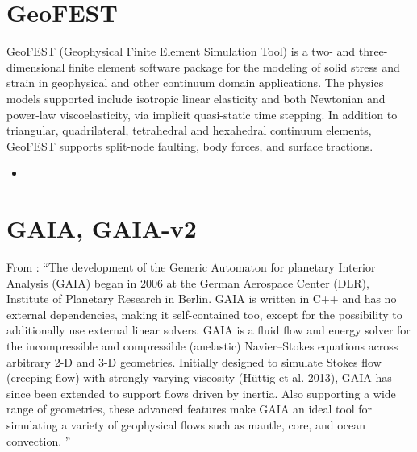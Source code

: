 
\section{GeoFEST} 
GeoFEST (Geophysical Finite Element Simulation Tool) is a two- and three-dimensional finite
element software package for the modeling of solid stress and strain in geophysical and 
other continuum domain applications.
The physics models supported include isotropic linear elasticity and both Newtonian and power-law
viscoelasticity, via implicit quasi-static time stepping. In addition to triangular, 
quadrilateral, tetrahedral and hexahedral continuum elements, GeoFEST supports split-node 
faulting, body forces, and surface tractions.


\begin{small}
\begin{itemize}
\item[2008] \textcite{paln08}
\end{itemize}
\end{small}


\section{GAIA, GAIA-v2} 

From \cite{momh25}: ``The development of the Generic Automaton for planetary Interior
Analysis (GAIA) began in 2006 at the German Aerospace Center (DLR), Institute of 
Planetary Research in Berlin. GAIA is written in C++ and has no external dependencies, 
making it self-contained too, except for the possibility to additionally use external 
linear solvers.
GAIA is a fluid flow and energy solver for the incompressible and
compressible (anelastic) Navier–Stokes equations across arbitrary
2-D and 3-D geometries. Initially designed to simulate Stokes flow
(creeping flow) with strongly varying viscosity (Hüttig et al. 2013),
GAIA has since been extended to support flows driven by inertia.
Also supporting a wide range of geometries, these advanced features
make GAIA an ideal tool for simulating a variety of geophysical flows
such as mantle, core, and ocean convection.
''

